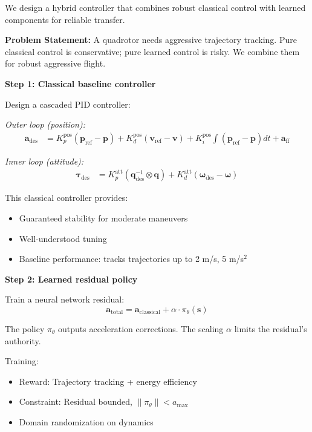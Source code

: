 \begin{example}
\label{ex:hybrid_controller}
We design a hybrid controller that combines robust classical control with learned components for reliable transfer.

\textbf{Problem Statement:}
A quadrotor needs aggressive trajectory tracking. Pure classical control is conservative; pure learned control is risky. We combine them for robust aggressive flight.

\textbf{Step 1: Classical baseline controller}

Design a cascaded PID controller:

\textit{Outer loop (position):}
\begin{align}
\mathbf{a}_{\text{des}} &= K_p^{\text{pos}}(\mathbf{p}_{\text{ref}} - \mathbf{p}) + K_d^{\text{pos}}(\mathbf{v}_{\text{ref}} - \mathbf{v}) + K_i^{\text{pos}} \int (\mathbf{p}_{\text{ref}} - \mathbf{p}) dt + \mathbf{a}_{\text{ff}}
\end{align}

\textit{Inner loop (attitude):}
\begin{align}
\boldsymbol{\tau}_{\text{des}} &= K_p^{\text{att}}(\mathbf{q}_{\text{des}}^{-1} \otimes \mathbf{q}) + K_d^{\text{att}}(\boldsymbol{\omega}_{\text{des}} - \boldsymbol{\omega})
\end{align}

This classical controller provides:
\begin{itemize}
    \item Guaranteed stability for moderate maneuvers
    \item Well-understood tuning
    \item Baseline performance: tracks trajectories up to 2 m/s, 5 m/s$^2$
\end{itemize}

\textbf{Step 2: Learned residual policy}

Train a neural network residual:
\begin{equation}
\mathbf{a}_{\text{total}} = \mathbf{a}_{\text{classical}} + \alpha \cdot \pi_\theta(\mathbf{s})
\end{equation}

The policy $\pi_\theta$ outputs acceleration corrections. The scaling $\alpha$ limits the residual's authority.

Training:
\begin{itemize}
    \item Reward: Trajectory tracking + energy efficiency
    \item Constraint: Residual bounded, $\|\pi_\theta\| < a_{\max}$
    \item Domain randomization on dynamics
\end{itemize}


\end{example}
